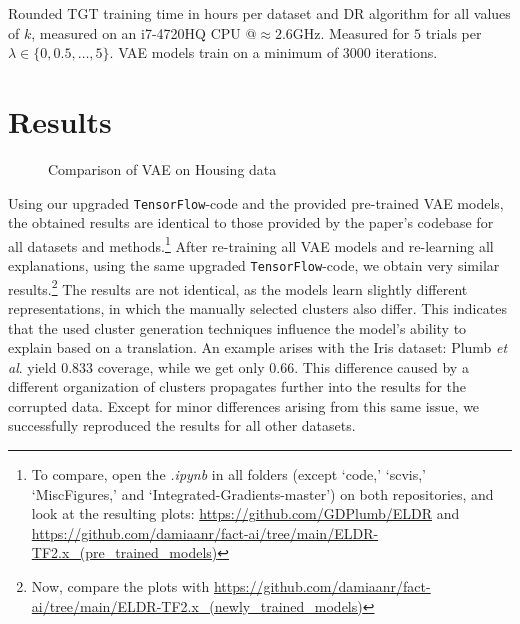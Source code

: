 \begin{table}[h]
  \centering
  
  \caption{Rounded TGT training time in hours per dataset and DR algorithm for all values of $k$, measured on an i7-4720HQ CPU @$\approx2.6$GHz. Measured for $5$ trials per $\lambda \in \{0, 0.5,  \ldots , 5\}$. VAE models train on a minimum of 3000 iterations.}
\end{table}

\section{Results}
\begin{figure}
  \vspace*{-0.75cm}
  \caption{Comparison of VAE on Housing data}
\end{figure}

Using our upgraded \texttt{TensorFlow}-code and the provided pre-trained VAE models, the obtained results are identical to those provided by the paper's codebase for all datasets and methods.\footnote{To compare, open the \textit{.ipynb} in all folders (except `code,' `scvis,' `MiscFigures,' and `Integrated-Gradients-master') on both repositories, and look at the resulting plots: \url{https://github.com/GDPlumb/ELDR} and \url{https://github.com/damiaanr/fact-ai/tree/main/ELDR-TF2.x_(pre_trained_models)}} After re-training all VAE models and re-learning all explanations, using the same upgraded \texttt{TensorFlow}-code, we obtain very similar results.\footnote{Now, compare the plots with \url{https://github.com/damiaanr/fact-ai/tree/main/ELDR-TF2.x_(newly_trained_models)}} The results are not identical, as the models learn slightly different representations, in which the manually selected clusters also differ. This indicates that the used cluster generation techniques influence the model's ability to explain based on a translation. An example arises with the Iris dataset: Plumb \textit{et al}. yield $0.833$ coverage, while we get only $0.66$. This difference caused by a different organization of clusters propagates further into the results for the corrupted data. Except for minor differences arising from this same issue, we successfully reproduced the results for all other datasets.\\


